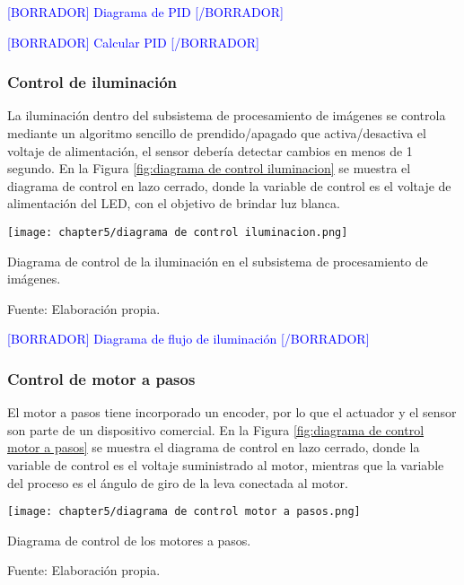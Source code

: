 \textcolor{blue}{[BORRADOR] Diagrama de PID [/BORRADOR]}

\textcolor{blue}{[BORRADOR] Calcular PID [/BORRADOR]}

\subsubsection{Control de iluminación}

La iluminación dentro del subsistema de procesamiento de imágenes se controla mediante un algoritmo sencillo de prendido/apagado que activa/desactiva el voltaje de alimentación, el sensor debería detectar cambios en menos de 1 segundo. En la Figura \ref{fig:diagrama de control iluminacion} se muestra el diagrama de control en lazo cerrado, donde la variable de control es el voltaje de alimentación del LED, con el objetivo de brindar luz blanca.

\begin{myfigure}[H]
	\footnotesize\centering
	\texttt{[image: chapter5/diagrama de control iluminacion.png]}
	\caption{Diagrama de control de la iluminación en el subsistema de procesamiento de imágenes.}
	\begin{myflushcenter}
		Fuente: Elaboración propia.
	\end{myflushcenter}
	\label{fig:diagrama de control iluminacion}
\end{myfigure}

\textcolor{blue}{[BORRADOR] Diagrama de flujo de iluminación [/BORRADOR]}

\subsubsection{Control de motor a pasos}

El motor a pasos tiene incorporado un encoder, por lo que el actuador y el sensor son parte de un dispositivo comercial. En la Figura \ref{fig:diagrama de control motor a pasos} se muestra el diagrama de control en lazo cerrado, donde la variable de control es el voltaje suministrado al motor, mientras que la variable del proceso es el ángulo de giro de la leva conectada al motor.

\begin{myfigure}[H]
	\footnotesize\centering
	\texttt{[image: chapter5/diagrama de control motor a pasos.png]}
	\caption{Diagrama de control de los motores a pasos.}
	\begin{myflushcenter}
		Fuente: Elaboración propia.
	\end{myflushcenter}
	\label{fig:diagrama de control motor a pasos}
\end{myfigure}

